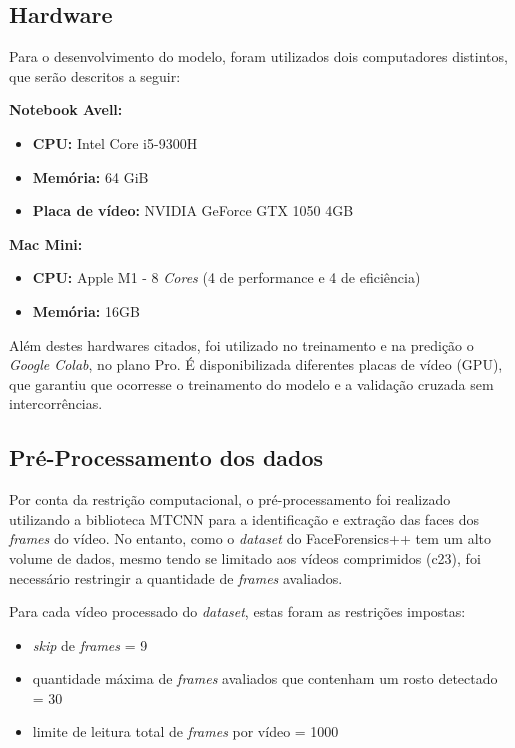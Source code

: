 \documentclass[12pt]{article}
\begin{document}
\subsection{Hardware}
Para o desenvolvimento do modelo, foram utilizados dois computadores distintos, que serão descritos a seguir:

\textbf{Notebook Avell:}
\begin{itemize}
  \item \textbf{CPU:} Intel Core i5-9300H
  \item \textbf{Memória:} 64 GiB
  \item \textbf{Placa de vídeo:} NVIDIA GeForce GTX 1050 4GB
\end{itemize}

\textbf{Mac Mini:}
\begin{itemize}
  \item \textbf{CPU:} Apple M1 - 8 \textit{Cores} (4 de performance e 4 de eficiência)
  \item \textbf{Memória:} 16GB
\end{itemize}

Além destes hardwares citados, foi utilizado no treinamento e na predição o \textit{Google Colab},
no plano Pro. É disponibilizada diferentes placas de vídeo (GPU), que garantiu que ocorresse o treinamento do modelo
e a validação cruzada sem intercorrências.


\subsection{Pré-Processamento dos dados}
Por conta da restrição computacional,
o pré-processamento foi realizado utilizando a biblioteca MTCNN \cite{7553523, zhang2017detecting}
para a identificação e extração das faces dos \textit{frames} do vídeo.
No entanto, como o \textit{dataset} do FaceForensics++ tem um alto volume de dados, mesmo tendo se limitado
aos vídeos comprimidos (c23), foi necessário restringir a quantidade de \textit{frames} avaliados.

Para cada vídeo processado do \textit{dataset}, estas foram as restrições impostas:

\begin{itemize}
  \item \textit{skip} de \textit{frames} = 9
  \item quantidade máxima de \textit{frames} avaliados que contenham um rosto
  detectado = 30
  \item limite de leitura total de \textit{frames} por vídeo = 1000
\end{itemize}
\end{document}

